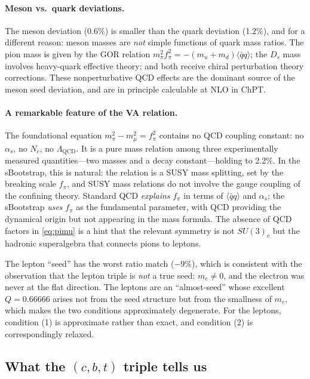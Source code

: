 \documentclass[12pt,a4paper]{article}
\newcommand{\qqbar}{\langle\bar{q}q\rangle}
\begin{document}
\paragraph{Meson vs.\ quark deviations.} The meson deviation 
(0.6\%) is smaller than the quark deviation (1.2\%), and for 
a different reason: meson masses are \emph{not} simple functions 
of quark mass ratios. The pion mass is given by the GOR 
relation $m_\pi^2 f_\pi^2 = -(m_u + m_d)\qqbar$; the $D_s$ 
mass involves heavy-quark effective theory; and both receive 
chiral perturbation theory corrections. These nonperturbative 
QCD effects are the dominant source of the meson seed deviation, 
and are in principle calculable at NLO in ChPT.

\paragraph{A remarkable feature of the VA relation.} The 
foundational equation $m_\pi^2 - m_\mu^2 = f_\pi^2$ contains 
no QCD coupling constant: no $\alpha_s$, no $N_c$, no 
$\Lambda_{\text{QCD}}$. It is a pure mass relation among three 
experimentally measured quantities---two masses and a decay 
constant---holding to 2.2\%. In the sBootstrap, this is natural: 
the relation is a SUSY mass splitting, set by the breaking 
scale $f_\pi$, and SUSY mass relations do not involve the gauge 
coupling of the confining theory. Standard QCD \emph{explains} 
$f_\pi$ in terms of $\qqbar$ and $\alpha_s$; the sBootstrap 
\emph{uses} $f_\pi$ as the fundamental parameter, with QCD 
providing the dynamical origin but not appearing in the mass 
formula. The absence of QCD factors in \eqref{eq:pimu} is a 
hint that the relevant symmetry is not $SU(3)_c$ but the 
hadronic superalgebra that connects pions to leptons.

The lepton ``seed'' has the worst ratio match ($-9\%$), which 
is consistent with the observation that the lepton triple is 
\emph{not} a true seed: $m_e \neq 0$, and the electron was never 
at the flat direction. The leptons are an ``almost-seed'' whose 
excellent $Q = 0.66666$ arises not from the seed structure but 
from the smallness of $m_e$, which makes the two conditions 
approximately degenerate. For the leptons, condition (1) is 
approximate rather than exact, and condition (2) is correspondingly 
relaxed.

\subsection{What the $(c,b,t)$ triple tells us}
\end{document}
